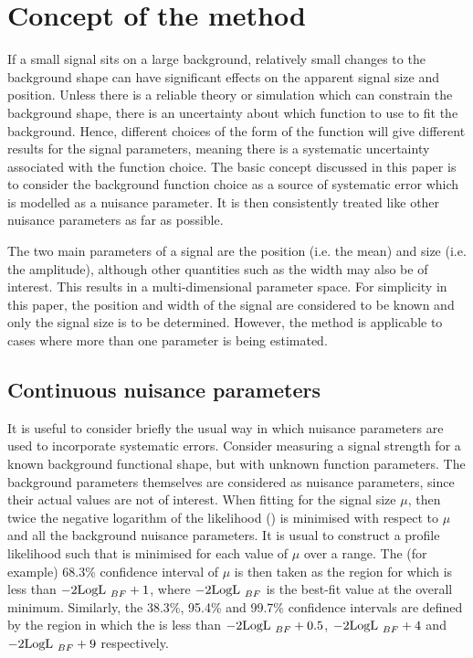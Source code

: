 \section{Concept of the method} %
\label{sec:concept}

If a small signal sits on
a large background, relatively small changes to the background shape can
have significant effects on the apparent signal size and position.
Unless there is a
reliable theory or simulation which can constrain the background shape,
there is an uncertainty about which function to use to fit
the background. Hence, different choices of the form of the function
will give different results for the signal parameters, meaning there is a
systematic uncertainty associated with the function choice.
The basic concept discussed in this paper is to consider the background
function choice as a source of systematic error which is modelled as a nuisance parameter.
It is then consistently treated like other nuisance parameters as far as
possible.

The two main parameters of a signal are the position (i.e. the mean)
and size (i.e. the amplitude), although other
quantities such as the width may also be of interest. This results in a
multi-dimensional parameter space. For simplicity in this paper, the position
and width of the signal are considered to be known and only the signal
size is to be determined. However, the method is applicable to
cases where more than one parameter is being estimated.

\subsection{Continuous nuisance parameters}
\label{sec:concept:continuous}

It is useful to consider briefly the usual way in which nuisance 
parameters are used to incorporate systematic errors. Consider measuring a signal
strength for a known background functional shape, but with unknown function
parameters. The background parameters themselves are considered as
nuisance parameters, since their actual values are not of interest.
When fitting for the signal size $\mu$, then twice the negative logarithm of the
likelihood (\nll) is minimised with respect to $\mu$ and all the background
nuisance parameters. It is usual to construct a profile likelihood
such that \nll is minimised for each value of $\mu$ over a range. 
The (for example) 68.3\% confidence interval of $\mu$ 
is then
taken as the region for which \nll is less than ${\rm -2LogL~}_{BF}+1$,
where ${\rm -2LogL~}_{BF}$ is the best-fit value at the overall minimum. 
Similarly, the 38.3\%, 95.4\% and 99.7\% confidence intervals are defined by the 
region in which the \nll is less than ${\rm -2LogL~}_{BF}+0.5$, ${\rm -2LogL~}_{BF}+4$ 
and ${\rm -2LogL~}_{BF}+9$ respectively. 


